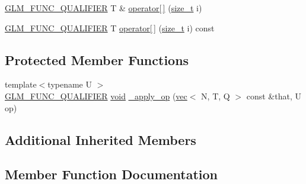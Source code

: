 \begin{DoxyCompactItemize}
\item 
\mbox{\hyperlink{setup_8hpp_a33fdea6f91c5f834105f7415e2a64407}{G\+L\+M\+\_\+\+F\+U\+N\+C\+\_\+\+Q\+U\+A\+L\+I\+F\+I\+ER}} T \& \mbox{\hyperlink{structglm_1_1detail_1_1__swizzle__base2_a9a31c29fd5419a40ef6ae9dbbbb3887e}{operator\mbox{[}$\,$\mbox{]}}} (\mbox{\hyperlink{_s_d_l__config__winrt_8h_a7c94ea6f8948649f8d181ae55911eeaf}{size\+\_\+t}} i)
\item 
\mbox{\hyperlink{setup_8hpp_a33fdea6f91c5f834105f7415e2a64407}{G\+L\+M\+\_\+\+F\+U\+N\+C\+\_\+\+Q\+U\+A\+L\+I\+F\+I\+ER}} T \mbox{\hyperlink{structglm_1_1detail_1_1__swizzle__base2_a0e341ddb30329eabeac3361833e45cd0}{operator\mbox{[}$\,$\mbox{]}}} (\mbox{\hyperlink{_s_d_l__config__winrt_8h_a7c94ea6f8948649f8d181ae55911eeaf}{size\+\_\+t}} i) const
\end{DoxyCompactItemize}
\subsection*{Protected Member Functions}
\begin{DoxyCompactItemize}
\item 
{\footnotesize template$<$typename U $>$ }\\\mbox{\hyperlink{setup_8hpp_a33fdea6f91c5f834105f7415e2a64407}{G\+L\+M\+\_\+\+F\+U\+N\+C\+\_\+\+Q\+U\+A\+L\+I\+F\+I\+ER}} \mbox{\hyperlink{_s_d_l__opengles2__gl2ext_8h_ae5d8fa23ad07c48bb609509eae494c95}{void}} \mbox{\hyperlink{structglm_1_1detail_1_1__swizzle__base2_a1b95928a524631e5bc6976ee1c7a6dd9}{\+\_\+apply\+\_\+op}} (\mbox{\hyperlink{structglm_1_1vec}{vec}}$<$ N, T, Q $>$ const \&that, U op)
\end{DoxyCompactItemize}
\subsection*{Additional Inherited Members}


\subsection{Member Function Documentation}
\mbox{\label{structglm_1_1detail_1_1__swizzle__base2_a1b95928a524631e5bc6976ee1c7a6dd9}} 

